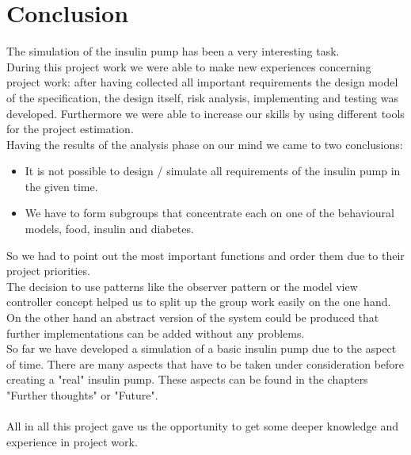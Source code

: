 \documentclass[pdflatex,a4paper,11pt,english]{scrreprt}
\begin{document}
\section{Conclusion}
The simulation of the insulin pump has been a very interesting task. \\
During this project work we were able to make new experiences concerning project work: after having collected all important requirements the design model of the specification, the design itself, risk analysis, implementing and testing was developed. Furthermore we were able to increase our skills by using different tools for the project estimation. \\
Having the results of the analysis phase on our mind we came to two conclusions:
\begin{itemize}
	\item It is not possible to design / simulate all requirements of the insulin 
			pump in the given time. 
	\item We have to form subgroups that concentrate each on one of the behavioural 
			models, food, insulin and diabetes.
\end{itemize}

So we had to point out the most important functions and order them due to their project priorities. \\
The decision to use patterns like the observer pattern or the model view controller concept helped us to split up the group work easily on the one hand. On the other hand an abstract version of the system could be produced that further implementations can be added without any problems. \\ 
So far we have developed a simulation of a basic insulin pump due to the aspect of time. There are many aspects that have to be taken under consideration before creating a "real" insulin pump. These aspects can be found in the chapters "Further thoughts" or "Future". \\ \\
All in all this project gave us the opportunity to get some deeper knowledge and experience in project work. 
\end{document}
